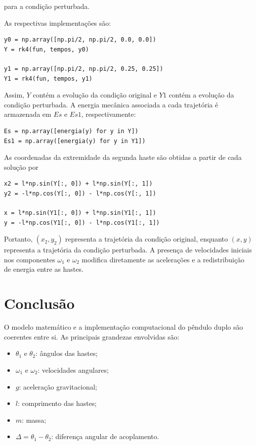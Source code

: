 \documentclass[12pt,a4paper]{article}
\begin{document}
para a condição perturbada.

As respectivas implementações são:

\begin{lstlisting}
y0 = np.array([np.pi/2, np.pi/2, 0.0, 0.0])
Y = rk4(fun, tempos, y0)

y1 = np.array([np.pi/2, np.pi/2, 0.25, 0.25])
Y1 = rk4(fun, tempos, y1)
\end{lstlisting}

Assim, $Y$ contém a evolução da condição original e $Y1$ contém a evolução da condição perturbada. A energia mecânica associada a cada trajetória é armazenada em $Es$ e $Es1$, respectivamente:

\begin{lstlisting}
Es = np.array([energia(y) for y in Y])
Es1 = np.array([energia(y) for y in Y1])
\end{lstlisting}

As coordenadas da extremidade da segunda haste são obtidas a partir de cada solução por

\begin{lstlisting}
x2 = l*np.sin(Y[:, 0]) + l*np.sin(Y[:, 1])
y2 = -l*np.cos(Y[:, 0]) - l*np.cos(Y[:, 1])

x = l*np.sin(Y1[:, 0]) + l*np.sin(Y1[:, 1])
y = -l*np.cos(Y1[:, 0]) - l*np.cos(Y1[:, 1])
\end{lstlisting}

Portanto, $(x_2,y_2)$ representa a trajetória da condição original, enquanto $(x,y)$ representa a trajetória da condição perturbada. A presença de velocidades iniciais nos componentes $\omega_1$ e $\omega_2$ modifica diretamente as acelerações e a redistribuição de energia entre as hastes.

\section{Conclusão}

O modelo matemático e a implementação computacional do pêndulo duplo são coerentes entre si. As principais grandezas envolvidas são:

\begin{itemize}
    \item $\theta_1$ e $\theta_2$: ângulos das hastes;
    \item $\omega_1$ e $\omega_2$: velocidades angulares;
    \item $g$: aceleração gravitacional;
    \item $l$: comprimento das hastes;
    \item $m$: massa;
    \item $\Delta=\theta_1-\theta_2$: diferença angular de acoplamento.
\end{itemize}
\end{document}
